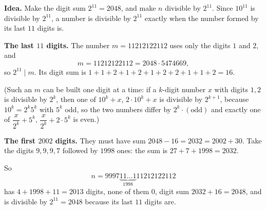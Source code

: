 \textbf{Idea.} Make the digit sum $2^{11}=2048$, and make $n$ divisible by $2^{11}$. Since $10^{11}$ is divisible by $2^{11}$, a number is divisible by $2^{11}$ exactly when the number formed by its last $11$ digits is.

\textbf{The last $11$ digits.} The number $m=11212122112$ uses only the digits $1$ and $2$, and
\[
m=11212122112=2048\cdot5474669 ,
\]
so $2^{11}\mid m$. Its digit sum is $1+1+2+1+2+1+2+2+1+1+2=16$.

(Such an $m$ can be built one digit at a time: if a $k$-digit number $x$ with digits $1,2$ is divisible by $2^k$, then one of $10^k+x$, $2\cdot10^k+x$ is divisible by $2^{k+1}$, because $10^k=2^k5^k$ with $5^k$ odd, so the two numbers differ by $2^k\cdot(\text{odd})$ and exactly one of $\dfrac{x}{2^k}+5^k$, $\dfrac{x}{2^k}+2\cdot5^k$ is even.)

\textbf{The first $2002$ digits.} They must have sum $2048-16=2032=2002+30$. Take the digits $9,9,9,7$ followed by $1998$ ones: the sum is $27+7+1998=2032$.

So
\[
n=\boxed{9997\underbrace{11\ldots1}_{1998}11212122112}
\]
has $4+1998+11=2013$ digits, none of them $0$, digit sum $2032+16=2048$, and is divisible by $2^{11}=2048$ because its last $11$ digits are.
